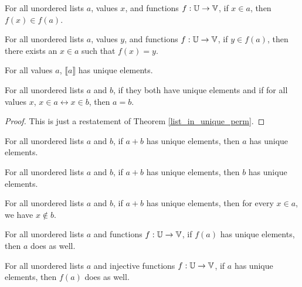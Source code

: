 \documentclass[../../math.tex]{subfiles}
\begin{document}
\begin{theorem} \label{in_ulist_image}
    For all unordered lists $a$, values $x$, and functions $f : \mathbb{U} \to \mathbb{V}$, if
    $x \in a$, then $f(x) \in f(a)$.
\end{theorem}

\begin{theorem} \label{image_in_ulist}
    For all unordered lists $a$, values $y$, and functions $f : \mathbb{U} \to \mathbb{V}$, if
    $y \in f(a)$, then there exists an $x \in a$ such that $f(x) = y$.
\end{theorem}

\begin{theorem}
    For all values $a$, $\llbracket a\rrbracket$ has unique elements.
\end{theorem}

\begin{theorem} \label{ulist_in_unique_eq}
    For all unordered lists $a$ and $b$, if they both have unique elements and
    if for all values $x$, $x \in a \leftrightarrow x \in b$, then $a = b$.
\end{theorem}
\begin{proof}
    This is just a restatement of Theorem \ref{list_in_unique_perm}.
\end{proof}

\begin{theorem} \label{ulist_unique_lconc}
    For all unordered lists $a$ and $b$, if $a + b$ has unique elements, then
    $a$ has unique elements.
\end{theorem}

\begin{theorem} \label{ulist_unique_rconc}
    For all unordered lists $a$ and $b$, if $a + b$ has unique elements, then
    $b$ has unique elements.
\end{theorem}

\begin{theorem} \label{ulist_unique_conc}
    For all unordered lists $a$ and $b$, if $a + b$ has unique elements, then
    for every $x \in a$, we have $x \notin b$.
\end{theorem}

\begin{theorem} \label{ulist_image_unique}
    For all unordered lists $a$ and functions $f : \mathbb{U} \to \mathbb{V}$, if $f(a)$ has
    unique elements, then $a$ does as well.
\end{theorem}

\begin{theorem} \label{ulist_image_unique_inj}
    For all unordered lists $a$ and injective functions $f : \mathbb{U} \to \mathbb{V}$, if $a$
    has unique elements, then $f(a)$ does as well.
\end{theorem}
\end{document}
